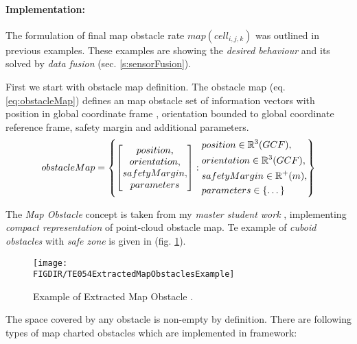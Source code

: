 \paragraph{Implementation:} The formulation of final map obstacle rate  $map(cell_{i,j,k})$ was outlined in previous examples. These examples are showing the \emph{desired behaviour} and its solved by \emph{data fusion} (sec. \ref{s:sensorFusion}).

First we start with obstacle map definition. The obstacle map  (eq. \ref{eq:obstacleMap}) defines an map obstacle set of information vectors with position in global coordinate frame , orientation bounded to global coordinate reference frame, safety margin and additional parameters.
\begin{equation}\label{eq:obstacleMap}
    obstacle Map= 
    \left\{
    \begin{bmatrix}
        position,\\
        orientation,\\
        safety Margin,\\
        parameters
    \end{bmatrix}
    :
    \begin{aligned}
        & position \in  \mathbb{R}^3(GCF),\\
        & orientation \in \mathbb{R}^3(GCF),\\
        & safety Margin \in \mathbb{R}^+(m),\\
        & parameters \in \{\dots\}
    \end{aligned}
    \right\}
\end{equation}


The \emph{Map Obstacle} concept is taken from my \emph{master student work} \cite{cernamaria2018}, implementing \emph{compact representation} of point-cloud obstacle map. Te example of \emph{cuboid obstacles} with \emph{safe zone} is given in (fig. \ref{fig:exampleExtractedMapObstacles}).
    
\begin{figure}[H]
    \centering
    \texttt{[image: \\FIGDIR/TE054ExtractedMapObstaclesExample]}
    \caption{Example of Extracted Map Obstacle \cite{cernamaria2018}.}
    \label{fig:exampleExtractedMapObstacles}
\end{figure} 

\newpage\noindent The space covered by any obstacle  is non-empty by definition. There are following types of map charted obstacles which are implemented in framework:


